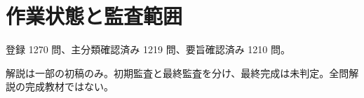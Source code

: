 \chapter{作業状態と監査範囲}
登録 1270 問、主分類確認済み 1219 問、要旨確認済み 1210 問。
\par 解説は一部の初稿のみ。初期監査と最終監査を分け、最終完成は未判定。全問解説の完成教材ではない。
